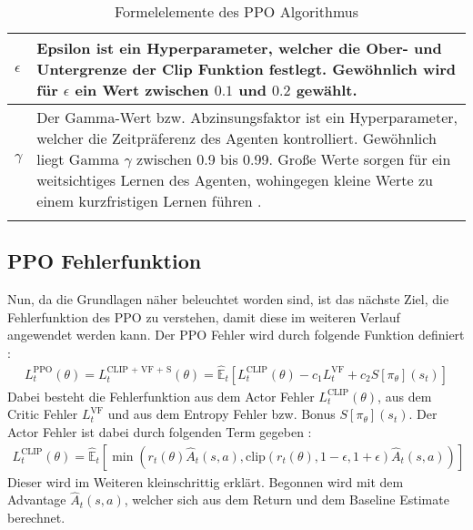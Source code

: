 \begin{longtable}[h]{|p{1.5cm}|p{\linewidth - 2.5cm}|}
	\hline
	$\epsilon$ & Epsilon ist ein Hyperparameter, welcher die Ober- und Untergrenze der Clip Funktion festlegt. Gewöhnlich wird für $\epsilon$ ein Wert zwischen $0.1$ und $0.2$ gewählt. \\
	\hline
	$\gamma$ \label{sign:Gamma} & Der Gamma-Wert bzw. Abzinsungsfaktor ist ein Hyperparameter, welcher die Zeitpräferenz des Agenten kontrolliert. Gewöhnlich liegt Gamma $\gamma$ zwischen 0.9 bis 0.99. Große Werte sorgen für ein weitsichtiges Lernen des Agenten, wohingegen kleine Werte zu einem kurzfristigen Lernen führen \citep[S. 43 bzw. Summary of Notation S. xv]{Sutton1998}. \\
	\hline
	\caption{Formelelemente des PPO Algorithmus}
	\label{tab:Grundlagen_Formelelemente_PPO} 
\end{longtable}

\subsection{PPO Fehlerfunktion} \label{subsec:Grundlagen_PPO_Fehlerfunktion}
Nun, da die Grundlagen näher beleuchtet worden sind, ist das nächste Ziel, die Fehlerfunktion des PPO zu verstehen, damit diese im weiteren Verlauf angewendet werden kann. Der PPO Fehler wird durch folgende Funktion definiert \citep[S. 5]{PPO}:
\begin{align}
	\label{eq:PPO_Training_Loss}
	L^\text{PPO}_{t} (\theta) = L^\text{CLIP + VF + S}_{t} (\theta) = \mathbb{\hat{E}}_{t} [L^{\text{CLIP}}_{t}(\theta) - c_{1}L^{\text{VF}}_{t} + c_{2}S[\pi_{\theta}](s_{t})]
\end{align}
Dabei besteht die Fehlerfunktion aus dem Actor Fehler $L^{\text{CLIP}}_{t}(\theta)$, aus dem Critic Fehler $L^{\text{VF}}_{t}$ und aus dem Entropy Fehler bzw. Bonus $S[\pi_{\theta}](s_{t})$. Der Actor Fehler ist dabei durch folgenden Term gegeben \citep[S. 3]{PPO}:
\begin{align}
	\label{eq:Grundlagen_Actor_Loss}
	L^\text{CLIP}_{t} (\theta) = \mathbb{\hat{E}}_{t} [ \min(r_{t}(\theta) \hat{A}_{t}(s, a), \text{clip}(r_{t}(\theta), 1 - \epsilon, 1 + \epsilon) \hat{A}_{t}(s, a))]
\end{align}
Dieser wird im Weiteren kleinschrittig erklärt. Begonnen wird mit dem Advantage $\hat{A}_{t}(s, a)$, welcher sich aus dem Return und dem Baseline Estimate berechnet.

